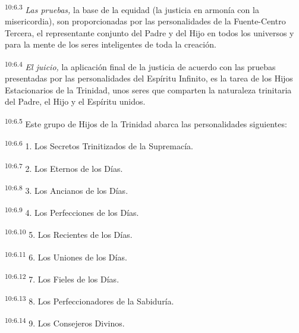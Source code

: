 \par
\textsuperscript{10:6.3} \textit{Las pruebas,} la base de la equidad (la justicia en armonía con la misericordia), son proporcionadas por las personalidades de la Fuente-Centro Tercera, el representante conjunto del Padre y del Hijo en todos los universos y para la mente de los seres inteligentes de toda la creación.

\par
\textsuperscript{10:6.4} \textit{El juicio,} la aplicación final de la justicia de acuerdo con las pruebas presentadas por las personalidades del Espíritu Infinito, es la tarea de los Hijos Estacionarios de la Trinidad, unos seres que comparten la naturaleza trinitaria del Padre, el Hijo y el Espíritu unidos.

\par
\textsuperscript{10:6.5} Este grupo de Hijos de la Trinidad abarca las personalidades siguientes:

\par
\textsuperscript{10:6.6} 1. Los Secretos Trinitizados de la Supremacía.

\par
\textsuperscript{10:6.7} 2. Los Eternos de los Días.

\par
\textsuperscript{10:6.8} 3. Los Ancianos de los Días.

\par
\textsuperscript{10:6.9} 4. Los Perfecciones de los Días.

\par
\textsuperscript{10:6.10} 5. Los Recientes de los Días.

\par
\textsuperscript{10:6.11} 6. Los Uniones de los Días.

\par
\textsuperscript{10:6.12} 7. Los Fieles de los Días.

\par
\textsuperscript{10:6.13} 8. Los Perfeccionadores de la Sabiduría.

\par
\textsuperscript{10:6.14} 9. Los Consejeros Divinos.

